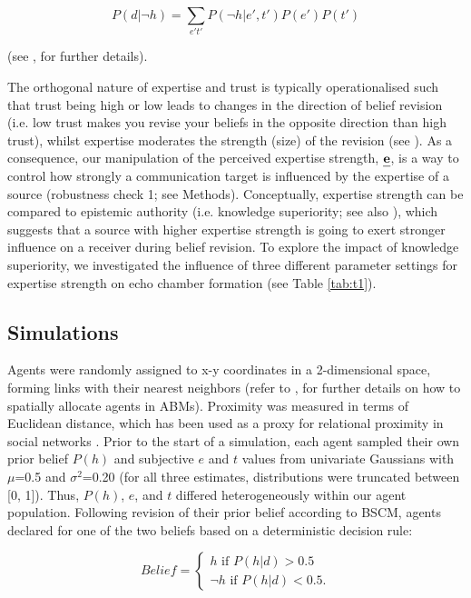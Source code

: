 \documentclass[fleqn,10pt]{wlscirep}
\begin{document}
\begin{equation}
    P(d|\neg h) = \sum_{e't'}P(\neg h|e',t')P(e')P(t') 
\end{equation}

(see \cite{hahn2009argument, harris2016appeal}, for further details).  

The orthogonal nature of expertise and trust is typically operationalised such that trust being high or low leads to changes in the direction of belief revision (i.e. low trust makes you revise your beliefs in the opposite direction than high trust), whilst expertise moderates the strength (size) of the revision (see  \cite{bovens2003bayesian, harris2016appeal}). As a consequence, our manipulation of the perceived expertise strength, \(\textbf{\emph{e}}\), is a way to control how strongly a communication target is influenced by the expertise of a source (robustness check 1; see Methods). Conceptually, expertise strength can be compared to epistemic authority (i.e. knowledge superiority; see also \cite{walton2010appeal}), which suggests that a source with higher expertise strength is going to exert stronger influence on a receiver during belief revision.  
To explore the impact of knowledge superiority, we investigated the influence of three different parameter settings for expertise strength on echo chamber formation (see Table \ref{tab:t1}). 


\subsection*{Simulations}
Agents were randomly assigned to x-y coordinates in a 2-dimensional space, forming links with their nearest neighbors (refer to \cite{wilensky2015introduction}, for further details on how to spatially allocate agents in ABMs). Proximity was measured in terms of Euclidean distance, which has been used as a proxy for relational proximity in social networks \cite{duggins2017}. Prior to the start of a simulation, each agent sampled their own prior belief \(P(h)\) and subjective \(e\) and \(t\) values from univariate Gaussians with \(\mu\)=0.5 and \(\sigma^2\)=0.20 (for all three estimates, distributions were truncated between [0, 1]). Thus, \(P(h)\), \(e\), and \(t\) differed heterogeneously within our agent population. Following revision of their prior belief according to BSCM, agents declared for one of the two beliefs based on a deterministic decision rule: 

\[
Belief = \begin{cases}
h \text{ if } P(h|d) > 0.5 \\
\neg h \text{ if } P(h|d) < 0.5. 
\end{cases}
\]
\end{document}
